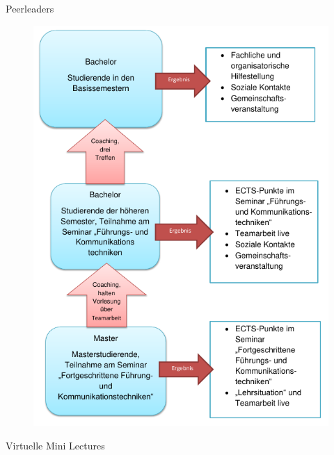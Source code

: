 \documentclass[final,hyperref={pdfpagelabels=false}]{beamer}
\begin{document}
\begin{frame}[t]
\begin{columns}[t]
\begin{column}{.465\textwidth}
\begin{block}{Peerleaders}
        \vspace{20px}
    \begin{figure}
        \includegraphics[width=0.9\linewidth]{imagesExample/schaubild}
    \end{figure}
    \vspace{40px}


\end{block}


\begin{block}{Virtuelle Mini Lectures}

\vspace{24px}


\end{block}
\end{column}
\end{columns}
\end{frame}
\end{document}
